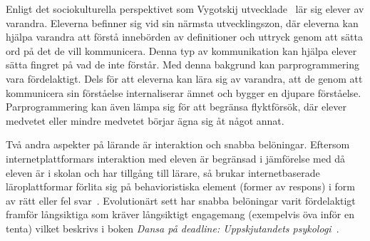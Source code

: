 Enligt det sociokulturella perspektivet som Vygotskij utvecklade~\cite{LSB_und}
lär sig elever av varandra. Eleverna befinner sig vid sin närmsta 
utvecklingszon, där eleverna kan hjälpa varandra att förstå innebörden av
definitioner och uttryck genom att sätta ord på det de vill kommunicera. Denna
typ av kommunikation kan hjälpa elever sätta fingret på vad de
inte förstår. Med denna bakgrund kan parprogrammering vara
fördelaktigt. Dels för att eleverna kan lära sig av varandra, att de genom att
kommunicera sin förståelse internaliserar ämnet och bygger en djupare
förståelse. Parprogrammering kan även lämpa sig för att begränsa
flyktförsök, där elever medvetet eller mindre medvetet börjar ägna sig åt något annat.


Två andra aspekter på lärande är interaktion och snabba
belöningar. Eftersom internetplattformars interaktion med eleven är
begränsad i jämförelse med då eleven är i skolan och har tillgång till
lärare, så brukar internetbaserade läroplattformar förlita sig på
behavioristiska element (former av respons) i form av rätt eller fel
svar~\cite{LSB_und}. Evolutionärt sett har snabba belöningar varit
fördelaktigt framför långsiktiga som kräver långsiktigt engagemang
(exempelvis öva inför en tenta) vilket beskrivs i boken \textit{Dansa
på deadline: Uppskjutandets psykologi}~\cite{DPD}.
